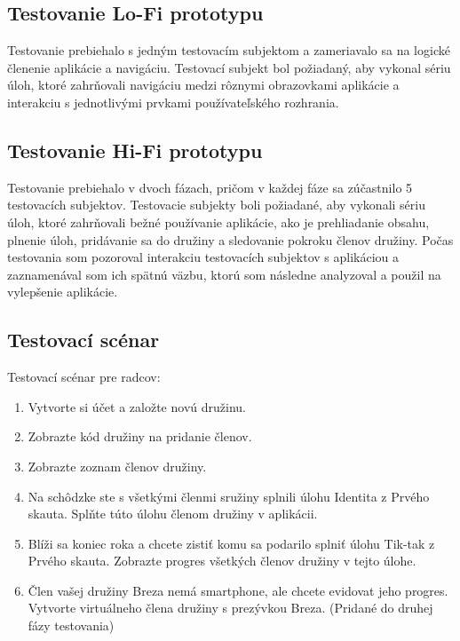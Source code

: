 \subsection{Testovanie Lo-Fi prototypu}
Testovanie prebiehalo s jedným testovacím subjektom a zameriavalo sa na logické členenie aplikácie a navigáciu. Testovací subjekt bol požiadaný, aby vykonal sériu úloh, ktoré zahrňovali navigáciu medzi rôznymi obrazovkami aplikácie a interakciu s jednotlivými prvkami používateľského rozhrania.

\subsection{Testovanie Hi-Fi prototypu}
Testovanie prebiehalo v dvoch fázach, pričom v každej fáze sa zúčastnilo 5 testovacích subjektov. Testovacie subjekty boli požiadané, aby vykonali sériu úloh, ktoré zahrňovali bežné používanie aplikácie, ako je prehliadanie obsahu, plnenie úloh, pridávanie sa do družiny a sledovanie pokroku členov družiny. Počas testovania som pozoroval interakciu testovacích subjektov s aplikáciou a zaznamenával som ich spätnú väzbu, ktorú som následne analyzoval a použil na vylepšenie aplikácie.

\subsection{Testovací scénar}


Testovací scénar pre radcov:
\begin{enumerate}
    \item Vytvorte si účet a založte novú družinu. 
    \item Zobrazte kód družiny na pridanie členov.
    \item Zobrazte zoznam členov družiny.
    \item Na schôdzke ste s všetkými členmi sružiny splnili úlohu Identita z Prvého skauta. Splňte túto úlohu členom družiny v aplikácii.
    \item Blíži sa koniec roka a chcete zistiť komu sa podarilo splniť úlohu Tik-tak z Prvého skauta. Zobrazte progres všetkých členov družiny v tejto úlohe.
    \item Člen vašej družiny Breza nemá smartphone, ale chcete evidovat jeho progres. Vytvorte virtuálneho člena družiny s prezývkou Breza. (Pridané do druhej fázy testovania)
\end{enumerate}


